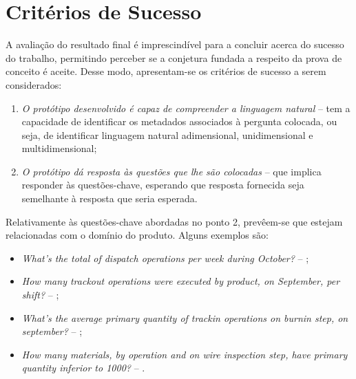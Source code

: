 \section{Critérios de Sucesso}
\label{sec:chap01_solutionevaluation}
A avaliação do resultado final é imprescindível para a concluir acerca do sucesso do trabalho, permitindo perceber se a conjetura fundada a respeito da prova de conceito é aceite. Desse modo, apresentam-se os critérios de sucesso a serem considerados:
%
\begin{enumerate}
    \item
    {
        \textit{O protótipo desenvolvido é capaz de compreender a linguagem natural} -- tem a capacidade de identificar os metadados associados à pergunta colocada, ou seja, de identificar linguagem natural adimensional, unidimensional e multidimensional;
    }
    \item
    {
        \textit{O protótipo dá resposta às questões que lhe são colocadas} -- que implica responder às questões-chave, esperando que resposta fornecida seja semelhante à resposta que seria esperada.
    }
\end{enumerate}

Relativamente às questões-chave abordadas no ponto 2, prevêem-se que estejam relacionadas com o domínio do produto. Alguns exemplos são:

\begin{itemize}
\item 
    {
        \textit{What's the total of dispatch operations per week during October?} -- ;
    }
    \item
    {
        \textit{How many trackout operations were executed by product, on September, per shift?} -- ;
    }
    \item
    {
        \textit{What's the average primary quantity of trackin operations on burnin step, on september?} -- ;
    }
    \item
    {
        \textit{How many materials, by operation and on wire inspection step, have primary quantity inferior to 1000?} -- .
    }
\end{itemize}

